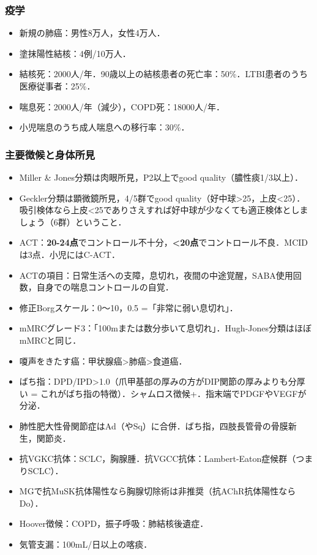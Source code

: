 \subsubsection{疫学}

\begin{itemize}
\item 新規の肺癌：男性8万人，女性4万人．
\item 塗抹陽性結核：4例/10万人．
\item 結核死：2000人/年．90歳以上の結核患者の死亡率：50\%．LTBI患者のうち医療従事者：25\%．
\item 喘息死：2000人/年（減少），COPD死：18000人/年．
\item 小児喘息のうち成人喘息への移行率：30\%．
\end{itemize}


\subsubsection{主要徴候と身体所見}

\begin{itemize}
\item Miller \& Jones分類は肉眼所見，P2以上でgood quality（膿性痰1/3以上）．
\item Geckler分類は顕微鏡所見，4/5群でgood quality（好中球>25，上皮<25）．吸引検体なら上皮<25でありさえすれば好中球が少なくても適正検体としましょう（6群）ということ．

\item ACT：\textbf{20-24点}でコントロール不十分，\textbf{<20点}でコントロール不良．MCIDは3点．小児にはC-ACT．
\item ACTの項目：日常生活への支障，息切れ，夜間の中途覚醒，SABA使用回数，自身での喘息コントロールの自覚．
\item 修正Borgスケール：0〜10，0.5 =「非常に弱い息切れ」．
\item mMRCグレード3：「100mまたは数分歩いて息切れ」．Hugh-Jones分類はほぼmMRCと同じ．


\item 嗄声をきたす癌：甲状腺癌>肺癌>食道癌．
\item ばち指：DPD/IPD>1.0（爪甲基部の厚みの方がDIP関節の厚みよりも分厚い = これがばち指の特徴）．シャムロス徴候+．指末端でPDGFやVEGFが分泌．
\item 肺性肥大性骨関節症はAd（やSq）に合併．ばち指，四肢長管骨の骨膜新生，関節炎．
\item 抗VGKC抗体：SCLC，胸腺腫．抗VGCC抗体：Lambert-Eaton症候群（つまりSCLC）．
\item MGで抗MuSK抗体陽性なら胸腺切除術は非推奨（抗AChR抗体陽性ならDo）．
\item Hoover徴候：COPD，振子呼吸：肺結核後遺症．
\item 気管支漏：100mL/日以上の喀痰．
\end{itemize}


